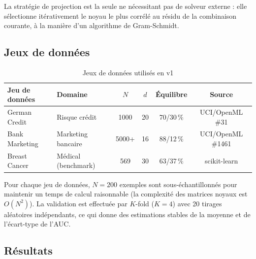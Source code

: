 \documentclass[12pt,a4paper]{article}
\begin{document}
La stratégie de projection est la seule ne nécessitant pas de solveur externe :
elle sélectionne itérativement le noyau le plus corrélé au résidu de la
combinaison courante, à la manière d'un algorithme de Gram-Schmidt.

\subsection{Jeux de données}

\begin{table}[H]
\centering
\caption{Jeux de données utilisés en v1}
\label{tab:v1_datasets}
\begin{tabular}{@{}llcccc@{}}
\toprule
\textbf{Jeu de données} & \textbf{Domaine} & $N$ & $d$ & \textbf{Équilibre} & \textbf{Source} \\
\midrule
German Credit    & Risque crédit    & 1000 & 20 & 70/30\,\%  & UCI/OpenML \#31    \\
Bank Marketing   & Marketing bancaire & 5000+ & 16 & 88/12\,\%  & UCI/OpenML \#1461  \\
Breast Cancer    & Médical (benchmark) & 569 & 30 & 63/37\,\%  & scikit-learn       \\
\bottomrule
\end{tabular}
\end{table}

Pour chaque jeu de données, $N = 200$ exemples sont sous-échantillonnés pour
maintenir un temps de calcul raisonnable (la complexité des matrices noyaux
est $O(N^2)$).
La validation est effectuée par $K$-fold ($K=4$) avec 20 tirages aléatoires
indépendants, ce qui donne des estimations stables de la moyenne et de
l'écart-type de l'AUC.

\subsection{Résultats}
\end{document}
